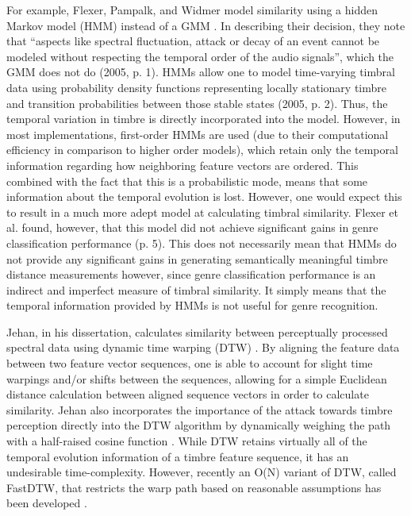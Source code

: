 \documentclass[12pt]{report} 	%
\numberwithin{figure}{chapter}
\numberwithin{table}{chapter}
\numberwithin{equation}{chapter}
\begin{document}
\begin{flushleft}
For example, Flexer, Pampalk, and Widmer model similarity using a hidden Markov model (HMM) instead of a GMM \cite{Flexer:2005sw}. In describing their decision, they note that ``aspects like spectral fluctuation, attack or decay of an event cannot be modeled without respecting the temporal order of the audio signals'', which the GMM does not do (2005, p. 1). HMMs allow one to model time-varying timbral data using probability density functions representing locally stationary timbre and transition probabilities between those stable states (2005, p. 2). Thus, the temporal variation in timbre is directly incorporated into the model. However, in most implementations, first-order HMMs are used (due to their computational efficiency in comparison to higher order models), which retain only the temporal information regarding how neighboring feature vectors are ordered. This combined with the fact that this is a probabilistic mode, means that some information about the temporal evolution is lost. However, one would expect this to result in a much more adept model at calculating timbral similarity. Flexer et al. found, however, that this model did not achieve significant gains in genre classification performance (p. 5). This does not necessarily mean that HMMs do not provide any significant gains in generating semantically meaningful timbre distance measurements however, since genre classification performance is an indirect and imperfect measure of timbral similarity. It simply means that the temporal information provided by HMMs is not useful for genre recognition.

Jehan, in his dissertation, calculates similarity between perceptually processed spectral data using dynamic time warping (DTW) \cite[p. 70]{Jehan:2005fy}. By aligning the feature data between two feature vector sequences, one is able to account for slight time warpings and/or shifts between the sequences, allowing for a simple Euclidean distance calculation between aligned sequence vectors in order to calculate similarity. Jehan also incorporates the importance of the attack towards timbre perception directly into the DTW algorithm by dynamically weighing the path with a half-raised cosine function \cite[p. 71]{Jehan:2005fy}. While DTW retains virtually all of the temporal evolution information of a timbre feature sequence, it has an undesirable time-complexity. However, recently an O(N) variant of DTW, called FastDTW, that restricts the warp path based on reasonable assumptions has been developed \cite{Salvador:2004et}.


\end{flushleft}
\end{document}
